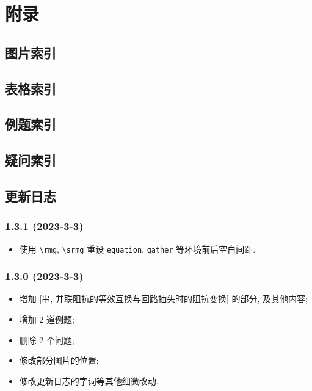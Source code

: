 \section{附录} \label{附录}
\subsection{图片索引} \label{图片索引}
\makeatletter
{}
\makeatother

\subsection{表格索引} \label{表格索引}
\makeatletter
{}
\makeatother

\subsection{例题索引} \label{例题索引}
\listofexampleprobs

\subsection{疑问索引} \label{疑问索引}
\listofquestions

\subsection{更新日志} \label{更新日志}
\subsubsection*{1.3.1 (2023-3-3)}
\begin{itemize}
    \item 使用 \texttt{\textbackslash rmg}, \texttt{\textbackslash srmg} 重设 \texttt{equation}, \texttt{gather} 等环境前后空白间距.
\end{itemize}

\subsubsection*{1.3.0 (2023-3-3)}
\begin{itemize}
    \item 增加 \ref{串, 并联阻抗的等效互换与回路抽头时的阻抗变换} 的部分, 及其他内容;
    \item 增加 2 道例题;
    \item 删除 2 个问题;
    \item 修改部分图片的位置;
    \item 修改更新日志的字词等其他细微改动.
\end{itemize}

